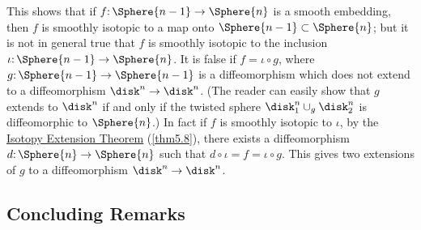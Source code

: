 \begin{remark*}
	This shows that if $f\mathpunct{:}\Sphere{n-1}\to \Sphere{n}$ is a smooth
	embedding, then $f$ is smoothly isotopic to a map onto $\Sphere{n-1}\subset\Sphere{n}$; but it is not in general true that $f$ is smoothly
	isotopic to the inclusion $\iota\mathpunct{:}\Sphere{n-1}\to \Sphere{n}$. It is false if
	$f = \iota\circ g$, where $g\mathpunct{:}\Sphere{n-1}\to \Sphere{n-1}$ is a diffeomorphism
	which does not extend to a diffeomorphism $\disk^n\to\disk^n$. (The
	reader can easily show that $g$ extends to $\disk^n$ if and only if
	the twisted sphere $\disk_1^n\cup_g \disk_2^n$ is diffeomorphic to $\Sphere{n}$.) In
	fact if $f$ is smoothly isotopic to $\iota$, by the \hyperref[thm5.8]{Isotopy 
	Extension Theorem} (\cref{thm5.8}), there exists a diffeomorphism $d\mathpunct{:}\Sphere{n}\to \Sphere{n}$
	such that $d\circ \iota=f=\iota\circ g$. This gives two extensions of $g$
	to a diffeomorphism $\disk^n\to\disk^n$.
\end{remark*}

\subsection*{Concluding Remarks}

